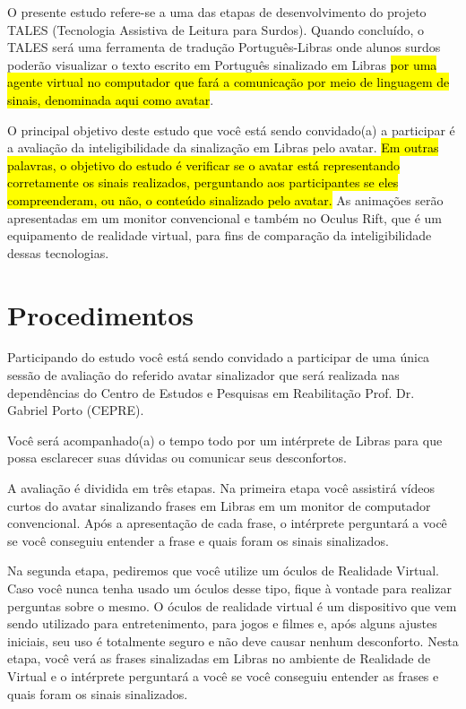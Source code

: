 \documentclass[a4paper,11pt,titlepage,singlespacing]{article}
\begin{document}
O presente estudo refere-se a uma das etapas de desenvolvimento do projeto TALES (Tecnologia Assistiva de Leitura para Surdos). Quando concluído, o TALES será uma ferramenta de tradução Português-Libras onde alunos surdos poderão visualizar o texto escrito em Português sinalizado em Libras \hl{por uma agente virtual no computador que fará a comunicação por meio de linguagem de sinais, denominada aqui como avatar}.


O principal objetivo deste estudo que você está sendo convidado(a) a participar é a avaliação da inteligibilidade da sinalização em Libras pelo avatar. \hl{Em outras palavras, o objetivo do estudo é verificar se o avatar está representando corretamente os sinais realizados, perguntando aos participantes se eles compreenderam, ou não, o conteúdo sinalizado pelo avatar.}
As animações serão apresentadas em um monitor convencional e também no Oculus Rift, que é um equipamento de realidade virtual, para fins de comparação da inteligibilidade dessas tecnologias.

\section*{Procedimentos}

Participando do estudo você está sendo convidado a participar de uma única sessão de avaliação do referido avatar sinalizador que será realizada nas dependências do Centro de Estudos e Pesquisas em Reabilitação Prof. Dr. Gabriel Porto (CEPRE).

Você será acompanhado(a) o tempo todo por um intérprete de Libras para que possa esclarecer suas dúvidas ou comunicar seus desconfortos.

A avaliação é dividida em três etapas. Na primeira etapa você assistirá vídeos curtos do avatar sinalizando frases em Libras em um monitor de computador convencional. Após a apresentação de cada frase, o intérprete perguntará a você se você conseguiu entender a frase e quais foram os sinais sinalizados.

Na segunda etapa, pediremos que você utilize um óculos de Realidade Virtual. Caso você nunca tenha usado um óculos desse tipo, fique à vontade para realizar perguntas sobre o mesmo. O óculos de realidade virtual é um dispositivo que vem sendo utilizado para entretenimento, para jogos e filmes e, após alguns ajustes iniciais, seu uso é totalmente seguro e não deve causar nenhum desconforto. Nesta etapa, você verá as frases sinalizadas em Libras no ambiente de Realidade de Virtual e o intérprete perguntará a você se você conseguiu entender as frases e quais foram os sinais sinalizados.
\end{document}
